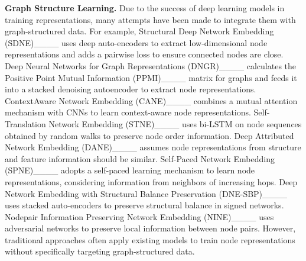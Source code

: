 \par\smallskip\noindent
\textbf{Graph Structure Learning.}
Due to the success of deep learning models in training representations, many attempts have been made to integrate them with graph-structured data. 
%
For example, Structural Deep Network Embedding (SDNE)____ uses deep auto-encoders to extract low-dimensional node representations and adds a pairwise loss to ensure connected nodes are close. 
%
Deep Neural Networks for Graph Representations (DNGR)____ calculates the Positive Point Mutual Information (PPMI)____ matrix for graphs and feeds it into a stacked denoising autoencoder to extract node representations. 
%
ContextAware Network Embedding (CANE)____ combines a mutual attention mechanism with CNNs to learn context-aware node representations. 
%
Self-Translation Network Embedding (STNE)____ uses bi-LSTM on node sequences obtained by random walks to preserve node order information. 
%
Deep Attributed Network Embedding (DANE)____ assumes node representations from structure and feature information should be similar. 
%
Self-Paced Network Embedding (SPNE)____ adopts a self-paced learning mechanism to learn node representations, considering information from neighbors of increasing hops. 
%
Deep Network Embedding with Structural Balance Preservation (DNE-SBP)____ uses stacked auto-encoders to preserve structural balance in signed networks. 
%
Nodepair Information Preserving Network Embedding (NINE)____ uses adversarial networks to preserve local information between node pairs. 
%
However, traditional approaches often apply existing models to train node representations without specifically targeting graph-structured data.



